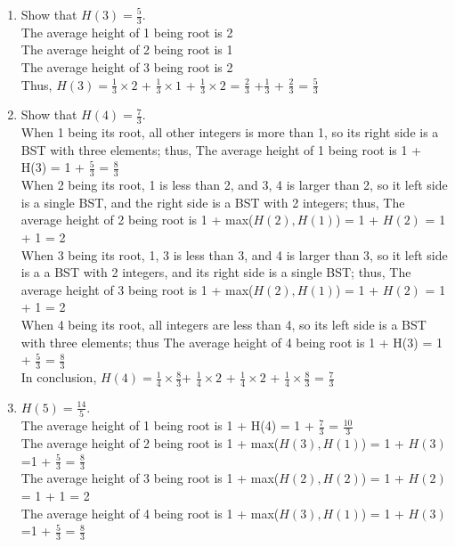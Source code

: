 \documentclass{assignment-263}
\begin{document}
\begin{enumerate}
\begin{enumerate}
  \item Show that $H(3) = \frac{5}{3}$.\\
      The average height of 1 being root is 2\\
      The average height of 2 being root is 1\\
      The average height of 3 being root is 2\\
      Thus, $H(3) =  \frac{1}{3} \times 2$ + $\frac{1}{3} \times 1$ + $\frac{1}{3} \times 2$ = $\frac{2}{3}$ +$\frac{1}{3} $ + $\frac{2}{3}$ = $\frac{5}{3}$
  \item Show that $H(4) = \frac{7}{3}$.\\
      When 1 being its root, all other integers is more than 1, so its right side is a BST with three elements; thus, 
      The average height of 1 being root is 1 + H(3) = 1 + $\frac{5}{3}$ = $\frac{8}{3}$ \\
      When 2 being its root, 1 is less than 2, and 3, 4 is larger than 2, so it left side is a single BST, and the right side is a BST with 2 integers; thus, 
      The average height of 2 being root is 1 + max($H(2), H(1)$) = 1 + $H(2)$ = 1 + 1 = 2\\
      When 3 being its root, 1, 3 is less than 3, and 4 is larger than 3, so it left side is a  a BST with 2 integers, and its right side is a single BST; thus, 
      The average height of 3 being root is 1 + max($H(2), H(1)$) = 1 + $H(2)$ = 1 + 1 = 2\\
      When 4 being its root, all integers are less than 4, so its left side is a BST with three elements; thus
      The average height of 4 being root is 1 + H(3) = 1 + $\frac{5}{3}$ = $\frac{8}{3}$\\
      In conclusion, $H(4) = \frac{1}{4} \times \frac{8}{3} $+ $\frac{1}{4} \times 2$ + $\frac{1}{4} \times 2$ + $ \frac{1}{4} \times \frac{8}{3}$ = $\frac{7}{3}$
  \item $H(5) = \frac{14}{5}$.\\
      The average height of 1 being root is 1 + H(4) = 1 + $\frac{7}{3}$ = $\frac{10}{3}$ \\
      The average height of 2 being root is 1 + max($H(3), H(1)$) = 1 + $H(3)$ =1 + $\frac{5}{3}$ = $\frac{8}{3}$\\
      The average height of 3 being root is 1 + max($H(2), H(2)$) = 1 + $H(2)$ = 1 + 1 = 2\\
      The average height of 4 being root is 1 + max($H(3), H(1)$) = 1 + $H(3)$ =1 + $\frac{5}{3}$ = $\frac{8}{3}$\\

\end{enumerate}
\end{enumerate}
\end{document}
